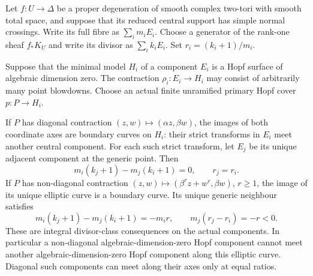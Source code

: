 \begin{proposition}\label{cdp:st:C.2.UN.40}

Let $f:U\to\Delta$ be a proper degeneration of smooth complex
two-tori with smooth total space, and suppose that its reduced
central support has simple normal crossings. Write its full
fibre as $\sum_i m_iE_i$. Choose a generator of the rank-one
sheaf $f_*K_U$ and write its divisor as $\sum_i k_iE_i$.
Set $r_i=(k_i+1)/m_i$.

Suppose that the minimal model $H_i$ of a component $E_i$
is a Hopf surface of algebraic dimension zero. The contraction
$\rho_i:E_i\to H_i$ may consist of arbitrarily many point
blowdowns. Choose an actual finite unramified primary Hopf
cover $p:P\to H_i$.

If $P$ has diagonal contraction $(z,w)\mapsto(\alpha z,\beta w)$,
the images of both coordinate axes are boundary curves on
$H_i$: their strict transforms in $E_i$ meet another central
component. For each such strict transform, let $E_j$ be its
unique adjacent component at the generic point. Then
\[
                 m_i(k_j+1)-m_j(k_i+1)=0,
                 \qquad r_j=r_i.
\tag{C.HA.1}\label{cdp:eq:C.HA.1}
\]
If $P$ has non-diagonal contraction
$(z,w)\mapsto(\beta^r z+w^r,\beta w)$, $r\geq1$, the image
of its unique elliptic curve is a boundary curve. Its unique
generic neighbour satisfies
\[
       m_i(k_j+1)-m_j(k_i+1)=-m_i r,
       \qquad m_j(r_j-r_i)=-r<0.
\tag{C.HA.2}\label{cdp:eq:C.HA.2}
\]
These are integral divisor-class consequences on the actual
components. In particular a non-diagonal algebraic-dimension-zero
Hopf component cannot meet another algebraic-dimension-zero
Hopf component along this elliptic curve. Diagonal such
components can meet along their axes only at equal ratios.
\end{proposition}

